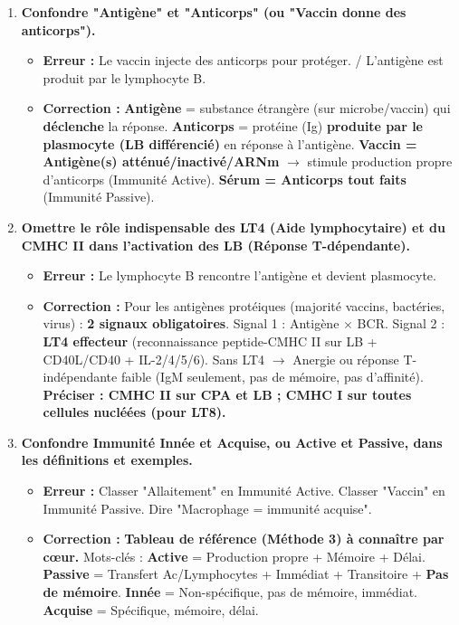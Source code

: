 \documentclass[11pt]{article}
\begin{document}
\begin{attention}
    \begin{enumerate}
        \item \textbf{Confondre "Antigène" et "Anticorps" (ou "Vaccin donne des anticorps").} 
        \begin{itemize}
            \item \textbf{Erreur :} \og Le vaccin injecte des anticorps pour protéger. \fg / \og L'antigène est produit par le lymphocyte B. \fg
            \item \textbf{Correction :} \textbf{Antigène} = substance étrangère (sur microbe/vaccin) qui \textbf{déclenche} la réponse. \textbf{Anticorps} = protéine (Ig) \textbf{produite par le plasmocyte (LB différencié)} en réponse à l'antigène. \textbf{Vaccin = Antigène(s) atténué/inactivé/ARNm} $\rightarrow$ stimule production propre d'anticorps (Immunité Active). \textbf{Sérum = Anticorps tout faits} (Immunité Passive).
        \end{itemize}
        \item \textbf{Omettre le rôle indispensable des LT4 (Aide lymphocytaire) et du CMHC II dans l'activation des LB (Réponse T-dépendante).}
        \begin{itemize}
            \item \textbf{Erreur :} \og Le lymphocyte B rencontre l'antigène et devient plasmocyte. \fg
            \item \textbf{Correction :} Pour les antigènes protéiques (majorité vaccins, bactéries, virus) : \textbf{2 signaux obligatoires}. Signal 1 : Antigène $\times$ BCR. Signal 2 : \textbf{LT4 effecteur} (reconnaissance peptide-CMHC II sur LB + CD40L/CD40 + IL-2/4/5/6). Sans LT4 $\rightarrow$ Anergie ou réponse T-indépendante faible (IgM seulement, pas de mémoire, pas d'affinité). \textbf{Préciser : CMHC II sur CPA et LB ; CMHC I sur toutes cellules nucléées (pour LT8).}
        \end{itemize}
        \item \textbf{Confondre Immunité Innée et Acquise, ou Active et Passive, dans les définitions et exemples.}
        \begin{itemize}
            \item \textbf{Erreur :} Classer "Allaitement" en Immunité Active. Classer "Vaccin" en Immunité Passive. Dire "Macrophage = immunité acquise".
            \item \textbf{Correction :} \textbf{Tableau de référence (Méthode 3) à connaître par cœur.} Mots-clés : \textbf{Active} = Production propre + Mémoire + Délai. \textbf{Passive} = Transfert Ac/Lymphocytes + Immédiat + Transitoire + \textbf{Pas de mémoire}. \textbf{Innée} = Non-spécifique, pas de mémoire, immédiat. \textbf{Acquise} = Spécifique, mémoire, délai.

\end{itemize}
\end{enumerate}
\end{attention}
\end{document}
